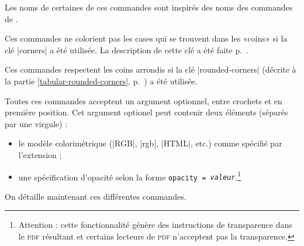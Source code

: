 \documentclass[dvipsnames]{article}%
\begin{document}
Les noms de certaines de ces commandes sont inspirés des noms des commandes de .

\medskip
Ces commandes ne colorient pas les cases qui se trouvent dans les «coins» si la
clé |corners| a été utilisée. La description de cette clé a été faite
p.~\pageref{corners}.

\medskip
Ces commandes respectent les coins arrondis si la clé |rounded-corners| (décrite
à la partie \ref{tabular-rounded-corners}, p.~\pageref{tabular-rounded-corners})
a été utilisée.

\medskip
Toutes ces commandes acceptent un argument optionnel, entre crochets et en
première position. Cet argument optionel peut contenir deux éléments (séparés
par une virgule) :
\begin{itemize}
\item le modèle colorimétrique (|RGB|, |rgb|, |HTML|, etc.) comme spécifié par
l'extension  ;
\item {}
une spécification d'opacité selon la forme \texttt{opacity =
  \textsl{valeur}}.\footnote{Attention : cette fonctionnalité génère des instructions de
  transparence dans le \textsc{pdf} résultant et certains lecteurs de
  \textsc{pdf} n'acceptent pas la transparence.}
\end{itemize}


\medskip
On détaille maintenant ces différentes commandes.
\end{document}
